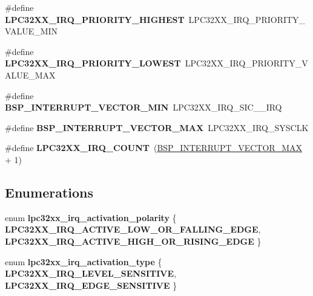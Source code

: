 \begin{DoxyCompactItemize}
\#define {\bfseries L\+P\+C32\+X\+X\+\_\+\+I\+R\+Q\+\_\+\+P\+R\+I\+O\+R\+I\+T\+Y\+\_\+\+H\+I\+G\+H\+E\+ST}~L\+P\+C32\+X\+X\+\_\+\+I\+R\+Q\+\_\+\+P\+R\+I\+O\+R\+I\+T\+Y\+\_\+\+V\+A\+L\+U\+E\+\_\+\+M\+IN
\item 
\mbox{\label{group__lpc32xx__interrupt_gafc8c0a55d401e43dceceb426bacd3e1b}} 
\#define {\bfseries L\+P\+C32\+X\+X\+\_\+\+I\+R\+Q\+\_\+\+P\+R\+I\+O\+R\+I\+T\+Y\+\_\+\+L\+O\+W\+E\+ST}~L\+P\+C32\+X\+X\+\_\+\+I\+R\+Q\+\_\+\+P\+R\+I\+O\+R\+I\+T\+Y\+\_\+\+V\+A\+L\+U\+E\+\_\+\+M\+AX
\item 
\mbox{\label{group__lpc32xx__interrupt_ga64cbb02dfea4d6923abccaa0087d2a0d}} 
\#define {\bfseries B\+S\+P\+\_\+\+I\+N\+T\+E\+R\+R\+U\+P\+T\+\_\+\+V\+E\+C\+T\+O\+R\+\_\+\+M\+IN}~L\+P\+C32\+X\+X\+\_\+\+I\+R\+Q\+\_\+\+S\+I\+C\+\_\+\_\+\+I\+RQ
\item 
\mbox{\label{group__lpc32xx__interrupt_gae4a2cdda5816a4c83c2fac0a49880c6e}} 
\#define {\bfseries B\+S\+P\+\_\+\+I\+N\+T\+E\+R\+R\+U\+P\+T\+\_\+\+V\+E\+C\+T\+O\+R\+\_\+\+M\+AX}~L\+P\+C32\+X\+X\+\_\+\+I\+R\+Q\+\_\+\+S\+Y\+S\+C\+LK
\item 
\mbox{\label{group__lpc32xx__interrupt_ga33d6aded666359259877ad139d11c6f6}} 
\#define {\bfseries L\+P\+C32\+X\+X\+\_\+\+I\+R\+Q\+\_\+\+C\+O\+U\+NT}~(\mbox{\hyperlink{group__bsp__interrupt_gae4a2cdda5816a4c83c2fac0a49880c6e}{B\+S\+P\+\_\+\+I\+N\+T\+E\+R\+R\+U\+P\+T\+\_\+\+V\+E\+C\+T\+O\+R\+\_\+\+M\+AX}} + 1)
\end{DoxyCompactItemize}
\subsection*{Enumerations}
\begin{DoxyCompactItemize}
\item 
\mbox{\label{group__lpc32xx__interrupt_ga39555cf285cc949f4305f5262a028c44}} 
enum {\bfseries lpc32xx\+\_\+irq\+\_\+activation\+\_\+polarity} \{ {\bfseries L\+P\+C32\+X\+X\+\_\+\+I\+R\+Q\+\_\+\+A\+C\+T\+I\+V\+E\+\_\+\+L\+O\+W\+\_\+\+O\+R\+\_\+\+F\+A\+L\+L\+I\+N\+G\+\_\+\+E\+D\+GE}, 
{\bfseries L\+P\+C32\+X\+X\+\_\+\+I\+R\+Q\+\_\+\+A\+C\+T\+I\+V\+E\+\_\+\+H\+I\+G\+H\+\_\+\+O\+R\+\_\+\+R\+I\+S\+I\+N\+G\+\_\+\+E\+D\+GE}
 \}
\item 
\mbox{\label{group__lpc32xx__interrupt_gaf1398fa672e4e6a65250e6920e0ae894}} 
enum {\bfseries lpc32xx\+\_\+irq\+\_\+activation\+\_\+type} \{ {\bfseries L\+P\+C32\+X\+X\+\_\+\+I\+R\+Q\+\_\+\+L\+E\+V\+E\+L\+\_\+\+S\+E\+N\+S\+I\+T\+I\+VE}, 
{\bfseries L\+P\+C32\+X\+X\+\_\+\+I\+R\+Q\+\_\+\+E\+D\+G\+E\+\_\+\+S\+E\+N\+S\+I\+T\+I\+VE}
 \}
\end{DoxyCompactItemize}
